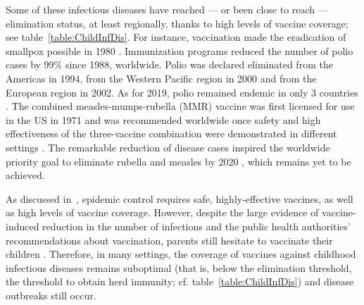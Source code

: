 Some of these infectious diseases have reached --- or been close to reach --- elimination status, at least regionally, thanks to high levels of vaccine coverage; see table~\ref{table:ChildInfDis}. For instance, vaccination made the eradication of smallpox possible in 1980 \cite[]{WHO_SmallpoxEradication1980,CDC_Smallpox2001}. Immunization programs reduced the number of polio cases by 99\% since 1988, worldwide. Polio was declared eliminated from the Americas in 1994, from the Western Pacific region in 2000 and from the European region in 2002. As for 2019, polio remained endemic in only 3 countries \cite[]{WHO_Factsheet_Polio}. The combined measles-mumps-rubella (MMR) vaccine was first licensed for use in the US in 1971 and was recommended worldwide once safety and high effectiveness of the three-vaccine combination were demonstrated in different settings \cite[]{Strebel2013}. The remarkable reduction of disease cases inspired the worldwide priority goal to eliminate rubella and measles by 2020 \cite[]{Andrus2011,WHO_MRPlan2012}, which remains yet to be achieved.

As discussed in~, epidemic control requires safe, highly-effective vaccines, as well as high levels of vaccine coverage. However, despite the large evidence of vaccine-induced reduction in the number of infections and the public health authorities' recommendations about vaccination, parents still hesitate to vaccinate their children \cite[]{Larson2016}. Therefore, in many settings, the coverage of vaccines against childhood infectious diseases remains suboptimal (that is, below the elimination threshold, the threshold to obtain herd immunity; cf. table~\ref{table:ChildInfDis}) and disease outbreaks still occur.

